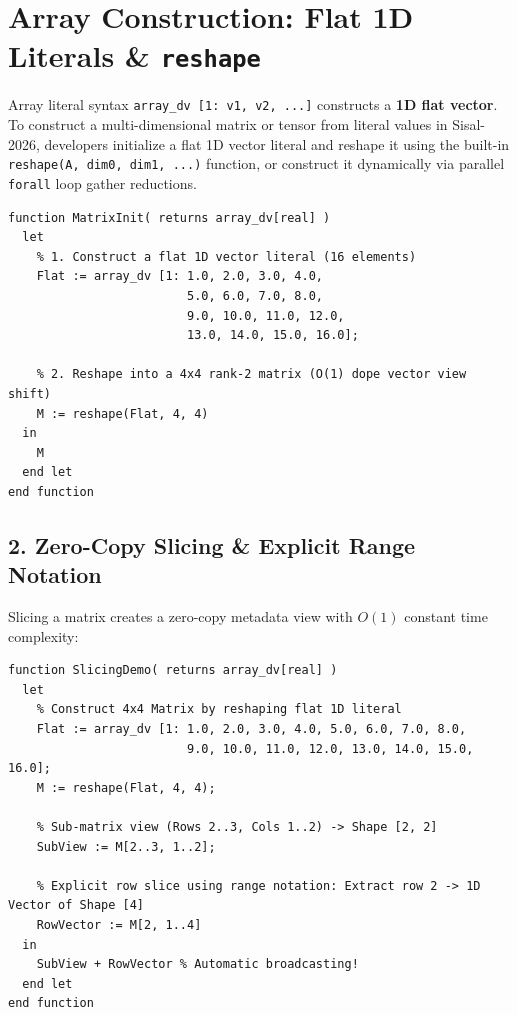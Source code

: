 \section{Array Construction: Flat 1D Literals \& \texttt{reshape}}
Array literal syntax \texttt{array\_dv [1: v1, v2, ...]} constructs a \textbf{1D flat vector}. To construct a multi-dimensional matrix or tensor from literal values in Sisal-2026, developers initialize a flat 1D vector literal and reshape it using the built-in \texttt{reshape(A, dim0, dim1, ...)} function, or construct it dynamically via parallel \texttt{forall} loop gather reductions.

\begin{lstlisting}[caption={Multi-Dimensional Array Construction via \texttt{reshape}}]
function MatrixInit( returns array_dv[real] )
  let
    % 1. Construct a flat 1D vector literal (16 elements)
    Flat := array_dv [1: 1.0, 2.0, 3.0, 4.0, 
                         5.0, 6.0, 7.0, 8.0, 
                         9.0, 10.0, 11.0, 12.0, 
                         13.0, 14.0, 15.0, 16.0];
                         
    % 2. Reshape into a 4x4 rank-2 matrix (O(1) dope vector view shift)
    M := reshape(Flat, 4, 4)
  in
    M
  end let
end function
\end{lstlisting}

\subsection{2. Zero-Copy Slicing \& Explicit Range Notation}
Slicing a matrix creates a zero-copy metadata view with $O(1)$ constant time complexity:

\begin{lstlisting}[caption={Zero-Copy Slicing in Sisal-2026}]
function SlicingDemo( returns array_dv[real] )
  let
    % Construct 4x4 Matrix by reshaping flat 1D literal
    Flat := array_dv [1: 1.0, 2.0, 3.0, 4.0, 5.0, 6.0, 7.0, 8.0, 
                         9.0, 10.0, 11.0, 12.0, 13.0, 14.0, 15.0, 16.0];
    M := reshape(Flat, 4, 4);
                      
    % Sub-matrix view (Rows 2..3, Cols 1..2) -> Shape [2, 2]
    SubView := M[2..3, 1..2];
    
    % Explicit row slice using range notation: Extract row 2 -> 1D Vector of Shape [4]
    RowVector := M[2, 1..4]
  in
    SubView + RowVector % Automatic broadcasting!
  end let
end function
\end{lstlisting}

